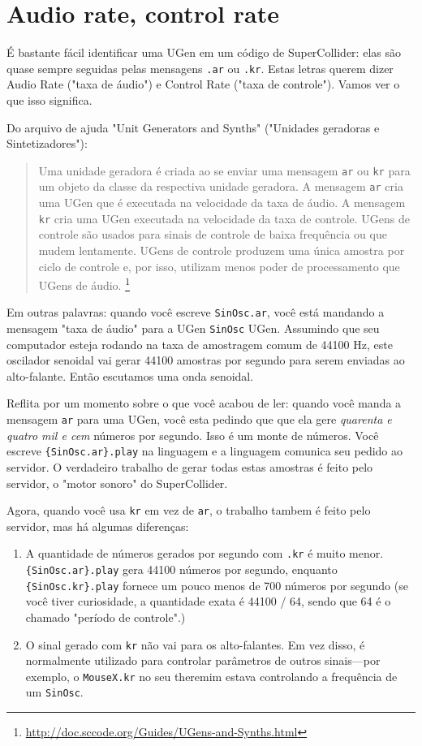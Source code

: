 \section{Audio rate, control rate}

É bastante fácil identificar uma UGen em um código de SuperCollider: elas são quase sempre seguidas pelas mensagens \texttt{.ar} ou \texttt{.kr}. Estas letras querem dizer Audio Rate ("taxa de áudio") e Control Rate ("taxa de controle"). Vamos ver o que isso significa.

Do arquivo de ajuda "Unit Generators and Synths" ("Unidades geradoras e Sintetizadores"): 

\begin{quotation}
Uma unidade geradora é criada ao se enviar uma mensagem \texttt{ar} ou \texttt{kr} para um objeto da classe da respectiva unidade geradora. A mensagem \texttt{ar} cria uma UGen que é executada na velocidade da taxa de áudio. A mensagem \texttt{kr} cria uma UGen executada na velocidade da taxa de controle. UGens de controle são usados para sinais de controle de baixa frequência ou que mudem lentamente. UGens de controle produzem uma única amostra por ciclo de controle e, por isso, utilizam menos poder de processamento que UGens de áudio. \footnote{\url{http://doc.sccode.org/Guides/UGens-and-Synths.html}}
\end{quotation}

Em outras palavras: quando você escreve \texttt{SinOsc.ar}, você está mandando a mensagem "taxa de áudio" para a UGen  \texttt{SinOsc} UGen. Assumindo que seu computador esteja rodando na taxa de amostragem comum de 44100 Hz, este oscilador senoidal vai gerar 44100 amostras por segundo para serem enviadas ao alto-falante. Então escutamos uma onda senoidal.

Reflita por um momento sobre o que você acabou de ler: quando você manda a mensagem \texttt{ar} para uma UGen, você esta pedindo que que ela gere \emph{quarenta e quatro mil e cem} números por segundo. Isso é um monte de números. Você escreve \texttt{\{SinOsc.ar\}.play} na linguagem e a linguagem comunica seu pedido ao servidor. O verdadeiro trabalho de gerar todas estas amostras é feito pelo servidor, o "motor sonoro" do SuperCollider.

Agora, quando você usa \texttt{kr} em vez de \texttt{ar}, o trabalho tambem é feito pelo servidor, mas há algumas diferenças:
\begin{enumerate}
\item A quantidade de números gerados por segundo com \texttt{.kr} é muito menor. \texttt{\{SinOsc.ar\}.play} gera 44100 números por segundo, enquanto \texttt{\{SinOsc.kr\}.play} fornece um pouco menos de 700 números por segundo (se você tiver curiosidade, a quantidade exata é 44100 / 64, sendo que 64 é o chamado "período de controle".)
\item O sinal gerado com \texttt{kr} não vai para os alto-falantes. Em vez disso, é normalmente utilizado para controlar parâmetros de outros sinais---por exemplo, o \texttt{MouseX.kr} no seu theremim estava controlando a frequência de um \texttt{SinOsc}.

\end{enumerate} 

